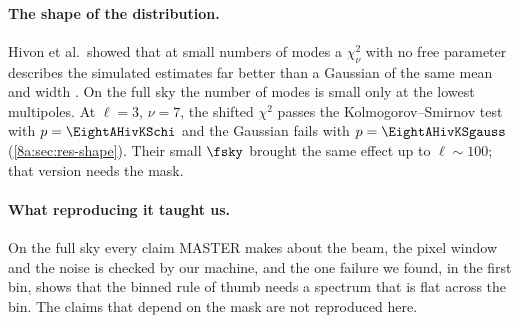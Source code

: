 \paragraph{The shape of the distribution.}
Hivon et al.\ showed that at small numbers of modes a $\chi^2_\nu$ with no free parameter
describes the simulated estimates far better than a Gaussian of the same mean and width
. On the full sky the number of modes is small only at the lowest
multipoles. At $\ell=3$, $\nu=7$, the shifted $\chi^2$ passes the Kolmogorov--Smirnov test with
$p=\EightAHivKSchi$ and the Gaussian fails with $p=\EightAHivKSgauss$
(\cref{8a:sec:res-shape}). Their small $\fsky$ brought the same effect up to $\ell\sim100$; that
version needs the mask.

\paragraph{What reproducing it taught us.}
On the full sky every claim MASTER makes about the beam, the pixel window and the noise is checked
by our machine, and the one failure we found, in the first bin, shows that the binned rule of
thumb needs a spectrum that is flat across the bin. The claims that depend on the mask are not
reproduced here.

